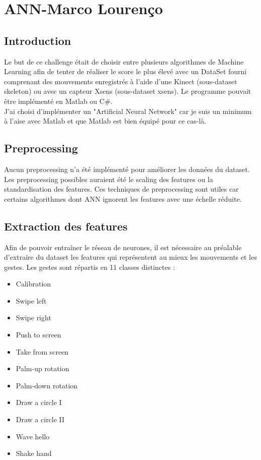 \newpage
\chapter*{ANN-Marco Lourenço}

\section*{Introduction}

Le but de ce challenge était de choisir entre plusieurs algorithmes de Machine Learning afin de tenter de réaliser le score le plus élevé avec un DataSet fourni comprenant des mouvements enregistrés à l'aide d'une Kinect (sous-dataset skeleton) ou avec un capteur Xsens (sous-dataset xsens). Le programme pouvait être implémenté en Matlab ou C\#.\\

J'ai choisi d'implémenter un "Artificial Neural Network" car je suis un minimum à l'aise avec Matlab et que Matlab est bien équipé pour ce cas-là.

\section*{Preprocessing}

Aucun preprocessing n'a été implémenté pour améliorer les données du dataset.\\

Les preprocessing possibles auraient été le scaling des features ou la standardisation des features. Ces techniques de preprocessing sont utiles car certains algorithmes dont ANN ignorent les features avec une échelle réduite.

\section*{Extraction des features}

Afin de pouvoir entraîner le réseau de neurones, il est nécessaire au préalable d'extraire du dataset les features qui représentent au mieux les mouvements et les gestes. Les gestes sont répartis en 11 classes distinctes : \\

\begin{itemize}
\item Calibration
\item Swipe left
\item Swipe right
\item Push to screen
\item Take from screen
\item Palm-up rotation
\item Palm-down rotation
\item Draw a circle I
\item Draw a circle II
\item Wave hello
\item Shake hand
\end{itemize}

